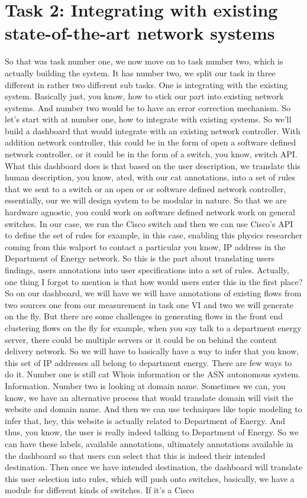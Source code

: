 \section{Task 2: Integrating with existing state-of-the-art network systems}



So that was task number one, we now move on to task number two, which is actually building the system. It has number two, we split our task in three different in rather two different sub tasks. One is integrating with the existing system. Basically just, you know, how to stick our part into existing network systems. And number two would be to have an error correction mechanism. So let's start with at number one, how to integrate with existing systems. So we'll build a dashboard that would integrate with an existing network controller. With addition network controller, this could be in the form of open a software defined network controller, or it could be in the form of a switch, you know, switch API. What this dashboard does is that based on the user description, we translate this human description, you know, ated, with our cat annotations, into a set of rules that we sent to a switch or an open or or software defined network controller, essentially, our we will design system to be modular in nature. So that we are hardware agnostic, you could work on software defined network work on general switches. In our case, we run the Cisco switch and then we can use Cisco's API to define the set of rules for example, in this case, enabling this physics researcher coming from this walport to contact a particular you know, IP address in the Department of Energy network. So this is the part about translating users findings, users annotations into user specifications into a set of rules. Actually, one thing I forgot to mention is that how would users enter this in the first place? So on our dashboard, we will have we will have annotations of existing flows from two sources one from our measurement in task one VI and two we will generate on the fly. But there are some challenges in generating flows in the front end clustering flows on the fly for example, when you say talk to a department energy server, there could be multiple servers or it could be on behind the content delivery network. So we will have to basically have a way to infer that you know, this set of IP addresses all belong to department energy. There are few ways to do it. Number one is still cat Whois information or the ASN autonomous system. Information. Number two is looking at domain name. Sometimes we can, you know, we have an alternative process that would translate domain will visit the website and domain name. And then we can use techniques like topic modeling to infer that, hey, this website is actually related to Department of Energy. And thus, you know, the user is really indeed talking to Department of Energy. So we can have these labels, available annotations, ultimately annotations available in the dashboard so that users can select that this is indeed their intended destination. Then once we have intended destination, the dashboard will translate this user selection into rules, which will push onto switches, basically, we have a module for different kinds of switches. If it's a Cisco 